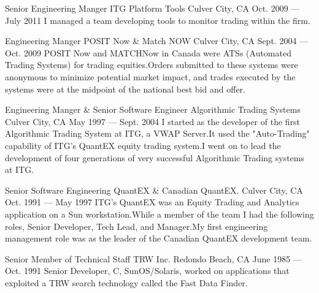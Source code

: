 
\begin{cventries}

\cventry
    {Senior Engineering Manger} %
    {ITG Platform Tools} %
    {Culver City, CA} %
    {Oct. 2009 --- July 2011} %
    {I managed a team developing tools to monitor trading within the firm.}

  \cventry
    {Engineering Manger} %
    {POSIT Now \& Match NOW} %
    {Culver City, CA} %
    {Sept. 2004 --- Oct. 2009} %
    {POSIT Now and MATCHNow in Canada were ATSs (Automated Trading Systems)
for trading equities.\@ Orders submitted to these systems were
anonymous to minimize potential market impact, and trades executed by
the systems were at the midpoint of the national best bid and offer.}

  \cventry
    {Engineering Manger \& Senior Software Engineer} %
    {Algorithmic Trading Systems} %
    {Culver City, CA} %
    {May 1997 --- Sept. 2004} %
    {I started as the developer of the first Algorithmic Trading System at
ITG, a VWAP Server.\@ It used the "Auto-Trading" capability of ITG's
QuantEX equity trading system.\@ I went on to lead the development of
four generations of very successful Algorithmic Trading systems at
ITG.}

  \cventry
    {Senior Software Engineering} %
    {QuantEX \& Canadian QuantEX.} %
    {Culver City, CA} %
    {Oct. 1991 --- May 1997} %
    {ITG's QuantEX was an Equity Trading and Analytics application on a Sun
workstation.\@ While a member of the team I had the following roles,
Senior Developer, Tech Lead, and Manager.\@ My first engineering
management role was as the leader of the Canadian QuantEX development
team.}

\end{cventries}



\begin{cventries}

  \cventry
    {Senior Member of Technical Staff} %
    {TRW Inc.} %
    {Redondo Beach, CA} %
    {June 1985 --- Oct. 1991} %
    {Senior Developer, C, SunOS/Solaris, worked on applications that exploited a TRW search technology called the Fast Data Finder.}

\end{cventries}


